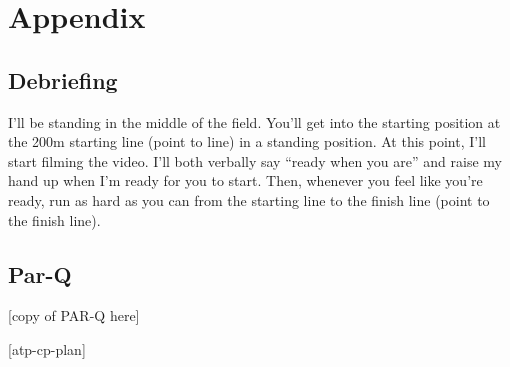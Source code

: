 \documentclass[index]{subfiles}
\begin{document}
\section{Appendix}
\subsection{Debriefing}
I'll be standing in the middle of the field. You'll get into the starting position at the 200m starting line (point to line) in a standing position. At this point, I'll start filming the video. I'll both verbally say ``ready when you are'' and raise my hand up when I'm ready for you to start. Then, whenever you feel like you're ready, run as hard as you can from the starting line to the finish line (point to the finish line).
\subsection{Par-Q}
[copy of PAR-Q here]

[atp-cp-plan]

\raggedright{}
\printbibliography[heading=bibintoc]
\end{document}
